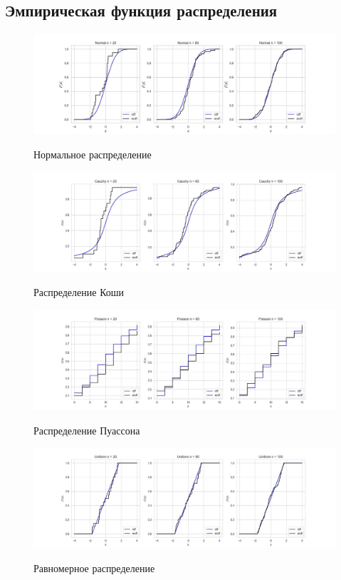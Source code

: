 \subsection{Эмпирическая функция распределения}
\begin{figure}[H]
	\centering
	{\includegraphics[scale=0.5]{task_4/resource/NormalEmp.jpg}}
		\caption{Нормальное распределение} 
		\label{fig:normal}
\end{figure}

\begin{figure}[H]
	{\includegraphics[scale=0.5]{task_4/resource/CauchyEmp.jpg}}
		\caption{Распределение Коши} 
		\label{fig:normal}
	\end{figure}

\begin{figure}[H]
	{\includegraphics[scale=0.5]{task_4/resource/PoissonEmp.jpg}}
		\caption{Распределение Пуассона} 
		\label{fig:normal}
	\end{figure}
	
\begin{figure}[H]
	{\includegraphics[scale=0.5]{task_4/resource/UniformEmp.jpg}}
		\caption{Равномерное распределение} 
		\label{fig:normal}
	\end{figure}
	

